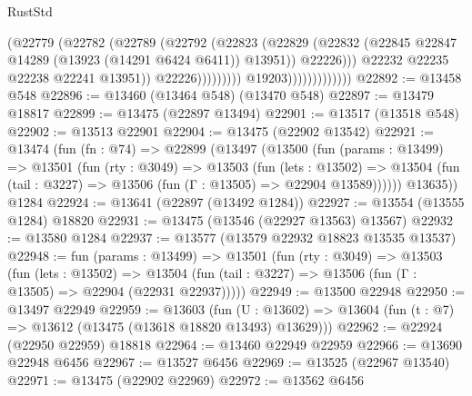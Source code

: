 \begin{lexlean}{RustStd}
\begin{coremodule}
                                              (@22779
                                                (@22782
                                                  (@22789
                                                    (@22792
                                                      (@22823
                                                        (@22829
                                                          (@22832
                                                            (@22845
                                                              @22847
                                                              @14289
                                                              (@13923 (@14291 @6424 @6411))
                                                              @13951))
                                                          @22226)))
                                                    @22232
                                                    @22235
                                                    @22238
                                                    @22241
                                                    @13951))
                                                @22226)))))))))
                              @19203)))))))))))))
@22892 := @13458 @548
@22896 := @13460 (@13464 @548) (@13470 @548)
@22897 := @13479 @18817
@22899 := @13475 (@22897 @13494)
@22901 := @13517 (@13518 @548)
@22902 := @13513 @22901
@22904 := @13475 (@22902 @13542)
@22921 := @13474
    (fun (fn : @74) =>
    @22899
      (@13497
        (@13500
          (fun (params : @13499) =>
          @13501
            (fun (rty : @3049) =>
            @13503
              (fun (lets : @13502) =>
              @13504 (fun (tail : @3227) => @13506 (fun (Γ : @13505) => @22904 @13589))))))
        @13635))
    @1284
@22924 := @13641 (@22897 (@13492 @1284))
@22927 := @13554 (@13555 @1284) @18820
@22931 := @13475 (@13546 (@22927 @13563) @13567)
@22932 := @13580 @1284
@22937 := @13577 (@13579 @22932 @18823 @13535 @13537)
@22948 := fun (params : @13499) =>
  @13501
    (fun (rty : @3049) =>
    @13503
      (fun (lets : @13502) =>
      @13504 (fun (tail : @3227) => @13506 (fun (Γ : @13505) => @22904 (@22931 @22937)))))
@22949 := @13500 @22948
@22950 := @13497 @22949
@22959 := @13603
    (fun (U : @13602) => @13604 (fun (t : @7) => @13612 (@13475 (@13618 @18820 @13493) @13629)))
@22962 := @22924 (@22950 @22959) @18818
@22964 := @13460 @22949 @22959
@22966 := @13690 @22948 @6456
@22967 := @13527 @6456
@22969 := @13525 (@22967 @13540)
@22971 := @13475 (@22902 @22969)
@22972 := @13562 @6456

\end{coremodule}
\end{lexlean}
